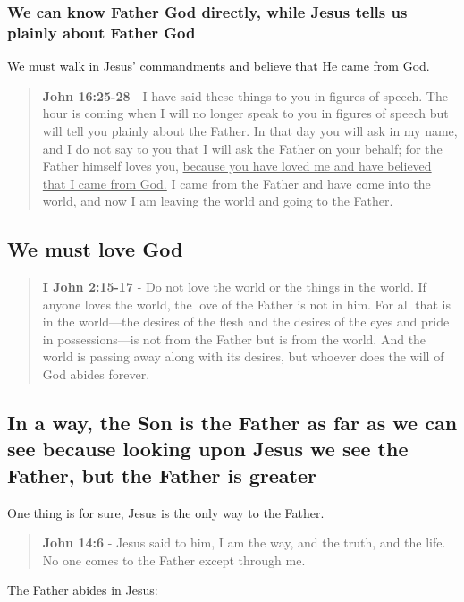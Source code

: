 \documentclass[11pt]{article}
\begin{document}
\subsubsection{We can know Father God directly, while Jesus tells us plainly about Father God}
\label{sec:org86608a7}
We must walk in Jesus' commandments and believe that He came from God.

\begin{quote}
\textbf{John 16:25-28} - I have said these things to you in figures of speech. The hour is coming when I will no longer speak to you in figures of speech but will tell you plainly about the Father. In that day you will ask in my name, and I do not say to you that I will ask the Father on your behalf; for the Father himself loves you, \uline{because you have loved me and have believed that I came from God.} I came from the Father and have come into the world, and now I am leaving the world and going to the Father.
\end{quote}

\subsection{We must love God}
\label{sec:orge1752f9}
\begin{quote}
\textbf{I John 2:15-17} - Do not love the world or the things in the world. If anyone loves the world, the love of the Father is not in him. For all that is in the world—the desires of the flesh and the desires of the eyes and pride in possessions—is not from the Father but is from the world. And the world is passing away along with its desires, but whoever does the will of God abides forever.
\end{quote}

\subsection{In a way, the Son is the Father as far as we can see because looking upon Jesus we see the Father, but the Father is greater}
\label{sec:orgc58b105}

One thing is for sure, Jesus is the only way to the Father.

\begin{quote}
\textbf{John 14:6} - Jesus said to him, I am the way, and the truth, and the life. No one comes to the Father except through me.
\end{quote}

The Father abides in Jesus:
\end{document}
